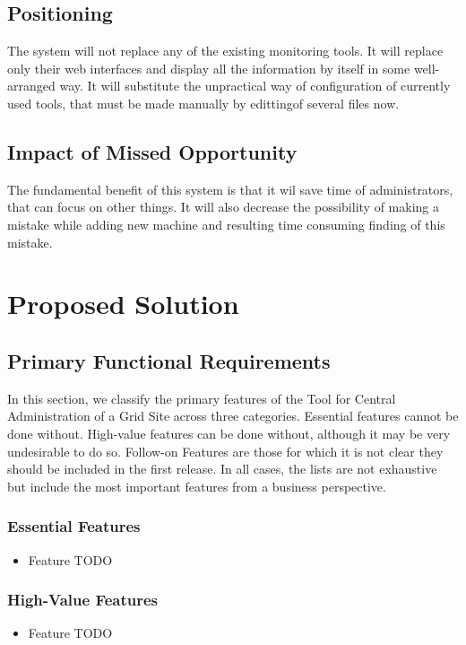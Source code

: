 \documentclass[12pt]{article}
\begin{document}
\subsection{Positioning}
The system will not replace any of the existing monitoring tools. It will replace only their web interfaces and display all the information by itself in some well-arranged way. It will substitute the unpractical way of configuration of currently used tools, that must be made manually by edittingof several files now.

\subsection{Impact of Missed Opportunity}
The fundamental benefit of this system is that it wil save time of administrators, that can focus on other things. It will also decrease the possibility of making a mistake while adding new machine and resulting time consuming finding of this mistake.


\section{Proposed Solution}

\subsection{Primary Functional Requirements}
In this section, we classify the primary features of the Tool for Central Administration of a Grid Site across three categories. Essential features cannot be done without. High-value features can be done without, although it may be very undesirable to do so. Follow-on Features are those for which it is not clear they should be included in the first release. In all cases, the lists are not exhaustive but include the most important features from a business perspective.

\subsubsection{Essential Features}
\begin{itemize}
\item Feature TODO
\end{itemize}

\subsubsection{High-Value Features}
\begin{itemize}
\item Feature TODO
\end{itemize}
\end{document}
